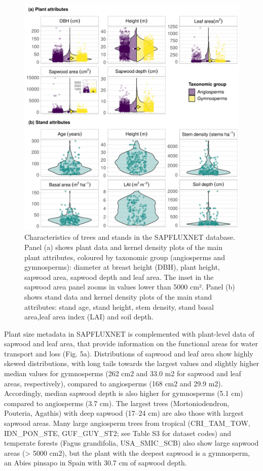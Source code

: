 \documentclass[11pt,twoside]{reedthesis}
\begin{document}
\setlength{\abovecaptionskip}{0pt}
\begin{figure}[hbt!]

{\centering \includegraphics[width=1\linewidth]{figure/CH3/Figure5} 

}

\caption[Characteristics of trees and stands in the SAPFLUXNET database.]{Characteristics of trees and stands in the SAPFLUXNET database. Panel (a) shows plant data and kernel density plots of the main plant attributes, coloured by taxonomic group (angiosperms and gymnosperms): diameter at breast height (DBH), plant height, sapwood area, sapwood depth and leaf area. The inset in the sapwood area panel zooms in values lower than 5000 cm². Panel (b) shows stand data and kernel density plots of the main stand attributes: stand age, stand height, stem density, stand basal area,leaf area index (LAI) and soil depth.}\label{fig:Ch2plot5}
\end{figure}
Plant size metadata in SAPFLUXNET is complemented with plant-level data
of sapwood and leaf area, that provide information on the functional
areas for water transport and loss (Fig. 5a). Distributions of sapwood
and leaf area show highly skewed distributions, with long tails towards
the largest values and slightly higher median values for gymnosperms
(262 cm2 and 33.0 m2 for sapwood and leaf areas, respectively), compared
to angiosperms (168 cm2 and 29.9 m2). Accordingly, median sapwood depth
is also higher for gymnosperms (5.1 cm) compared to angiosperms (3.7
cm). The largest trees (Mortoniodendron, Pouteria, Agathis) with deep
sapwood (17--24 cm) are also those with largest sapwood areas. Many
large angiosperm trees from tropical (CRI\_TAM\_TOW, IDN\_PON\_STE,
GUF\_GUY\_ST2; see Table S3 for dataset codes) and temperate forests
(Fagus grandifolia, USA\_SMIC\_SCB) also show large sapwood areas
(\textgreater{} 5000 cm2), but the plant with the deepest sapwood is a
gymnosperm, an Abies pinsapo in Spain with 30.7 cm of sapwood depth.\par
\end{document}
